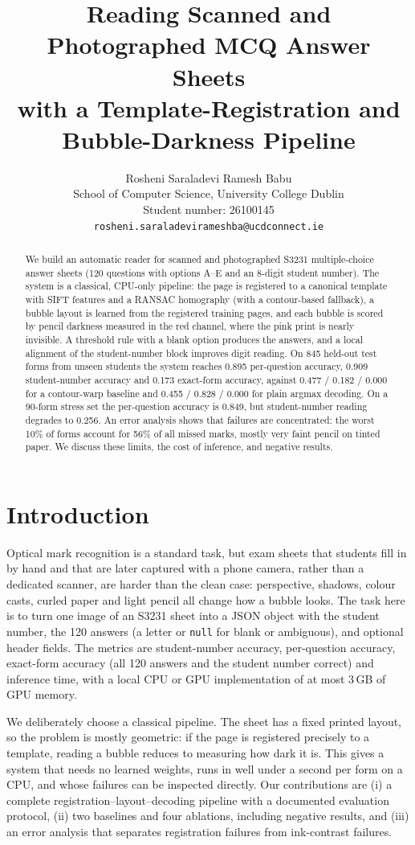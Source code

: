 \documentclass{article}
\title{Reading Scanned and Photographed MCQ Answer Sheets \\ with a Template-Registration and Bubble-Darkness Pipeline}
\author{%
  Rosheni Saraladevi Ramesh Babu \\
  School of Computer Science, University College Dublin \\
  Student number: 26100145 \\
  \texttt{rosheni.saraladevirameshba@ucdconnect.ie}
}
\begin{document}
\maketitle

\begin{abstract}
We build an automatic reader for scanned and photographed S3231 multiple-choice answer sheets
(120 questions with options A--E and an 8-digit student number). The system is a classical,
CPU-only pipeline: the page is registered to a canonical template with SIFT features and a RANSAC
homography (with a contour-based fallback), a bubble layout is learned from the registered
training pages, and each bubble is scored by pencil darkness measured in the red channel, where
the pink print is nearly invisible. A threshold rule with a blank option produces the answers, and
a local alignment of the student-number block improves digit reading. On 845 held-out test forms
from unseen students the system reaches 0.895 per-question accuracy, 0.909 student-number accuracy
and 0.173 exact-form accuracy, against 0.477 / 0.182 / 0.000 for a contour-warp baseline and
0.455 / 0.828 / 0.000 for plain argmax decoding. On a 90-form stress set the per-question accuracy
is 0.849, but student-number reading degrades to 0.256. An error analysis shows that failures are
concentrated: the worst 10\% of forms account for 56\% of all missed marks, mostly very faint
pencil on tinted paper. We discuss these limits, the cost of inference, and negative results.
\end{abstract}

\section{Introduction}
Optical mark recognition is a standard task, but exam sheets that students fill in by hand and
that are later captured with a phone camera, rather than a dedicated scanner, are harder than the
clean case: perspective, shadows, colour casts, curled paper and light pencil all change how a
bubble looks. The task here is to turn one image of an S3231 sheet into a JSON object with the
student number, the 120 answers (a letter or \texttt{null} for blank or ambiguous), and optional
header fields. The metrics are student-number accuracy, per-question accuracy, exact-form accuracy
(all 120 answers and the student number correct) and inference time, with a local CPU or GPU
implementation of at most 3\,GB of GPU memory.

We deliberately choose a classical pipeline. The sheet has a fixed printed layout, so the problem
is mostly geometric: if the page is registered precisely to a template, reading a bubble reduces to
measuring how dark it is. This gives a system that needs no learned weights, runs in well under a
second per form on a CPU, and whose failures can be inspected directly. Our contributions are
(i) a complete registration--layout--decoding pipeline with a documented evaluation protocol,
(ii) two baselines and four ablations, including negative results, and (iii) an error analysis that
separates registration failures from ink-contrast failures.
\end{document}
